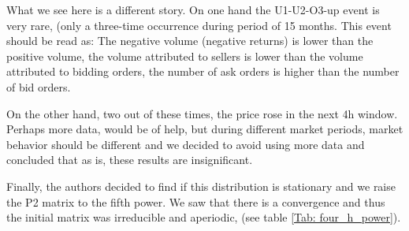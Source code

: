 What we see here is a different story. On one hand the U1-U2-O3-up event is very rare, (only a three-time occurrence during period of 15 months. This event should be read as: The negative volume (negative returns) is lower than the positive volume, the volume attributed to sellers is lower than the volume attributed to bidding orders, the number of ask orders is higher than the number of bid orders. 

On the other hand, two out of these times, the price rose in the next 4h window.  Perhaps more data, would be of help, but during different market periods, market behavior should be different and we decided to avoid using more data and concluded that as is, these results are insignificant.

Finally, the authors decided to find if this distribution is stationary and we raise the P2 matrix to the fifth power. We saw that there is a convergence and thus the initial matrix was irreducible and aperiodic, (see table \ref{Tab: four_h_power}). 

